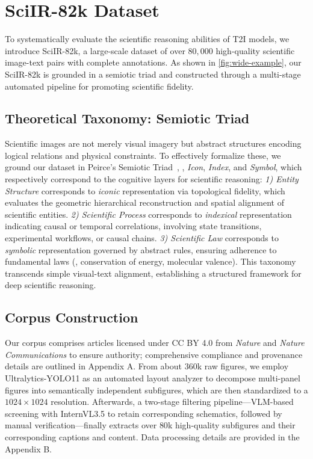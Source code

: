 \documentclass[runningheads]{llncs}
\begin{document}
\section{SciIR-82k Dataset}
To systematically evaluate the scientific reasoning abilities of T2I models, we introduce SciIR-82k, a large-scale dataset of over $80,000$ high-quality scientific image-text pairs with complete annotations. As shown in \cref{fig:wide-example}, our SciIR-82k is grounded in a semiotic triad and constructed through a multi-stage automated pipeline for promoting scientific fidelity.  

\subsection{Theoretical Taxonomy: Semiotic Triad}
\label{sec:Semiotic Triad}

Scientific images are not merely visual imagery but abstract structures encoding logical relations and physical constraints.
To effectively formalize these, we ground our dataset in Peirce's Semiotic Triad~\cite{peirce1931collected}, \ie, \textit{Icon}, \textit{Index}, and \textit{Symbol}, which respectively correspond to the cognitive layers for scientific reasoning: \textit{1) Entity Structure} corresponds to \textit{iconic} representation via topological fidelity, which evaluates the geometric hierarchical reconstruction and spatial alignment of scientific entities.
\textit{2) Scientific Process} corresponds to \textit{indexical} representation indicating causal or temporal correlations, involving state transitions, experimental workflows, or causal chains.
\textit{3) Scientific Law} corresponds to \textit{symbolic} representation governed by abstract rules, ensuring adherence to fundamental laws (\eg, conservation of energy, molecular valence).
This taxonomy transcends simple visual-text alignment, establishing a structured framework for deep scientific reasoning.

\subsection{Corpus Construction}

Our corpus comprises articles licensed under CC BY 4.0 from \textit{Nature} and \textit{Nature Communications} to ensure authority; comprehensive compliance and provenance details are outlined in Appendix A.
From about $360$k raw figures, we employ Ultralytics-YOLO11 \cite{jocher2024ultralytics} as an automated layout analyzer to decompose multi-panel figures into semantically independent subfigures, which are then standardized to a $1024\times1024$ resolution.
Afterwards, a two-stage filtering pipeline---VLM-based screening with InternVL3.5 \cite{wang2025internvl3} to retain corresponding schematics, followed by manual verification---finally extracts over $80$k high-quality subfigures and their corresponding captions and content.
Data processing details are provided in the Appendix B.
\end{document}
